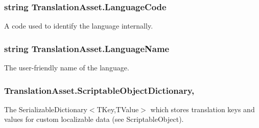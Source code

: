 \subsubsection[{\texorpdfstring{Language\+Code}{LanguageCode}}]{\setlength{\rightskip}{0pt plus 5cm}string Translation\+Asset.\+Language\+Code\hspace{0.3cm}{\ttfamily [get]}}\hypertarget{class_translation_asset_a77f3ad37c6e582d64fce3dce103133d7}{}\label{class_translation_asset_a77f3ad37c6e582d64fce3dce103133d7}


A code used to identify the language internally. 

\subsubsection[{\texorpdfstring{Language\+Name}{LanguageName}}]{\setlength{\rightskip}{0pt plus 5cm}string Translation\+Asset.\+Language\+Name\hspace{0.3cm}{\ttfamily [get]}}\hypertarget{class_translation_asset_a85c98c092730390bc574a75f5e1dca50}{}\label{class_translation_asset_a85c98c092730390bc574a75f5e1dca50}


The user-\/friendly name of the language. 

\subsubsection[{\texorpdfstring{Scriptable\+Object\+Dictionary}{ScriptableObjectDictionary}}]{ Translation\+Asset.\+Scriptable\+Object\+Dictionary\hspace{0.3cm}{\ttfamily [get]}, {\ttfamily [set]}}\hypertarget{class_translation_asset_a94c96a2eb5ea41e83a3d1d91002b86d6}{}\label{class_translation_asset_a94c96a2eb5ea41e83a3d1d91002b86d6}


The Serializable\+Dictionary$<$\+T\+Key,\+T\+Value$>$ which stores translation keys and values for custom localizable data (see Scriptable\+Object). 

